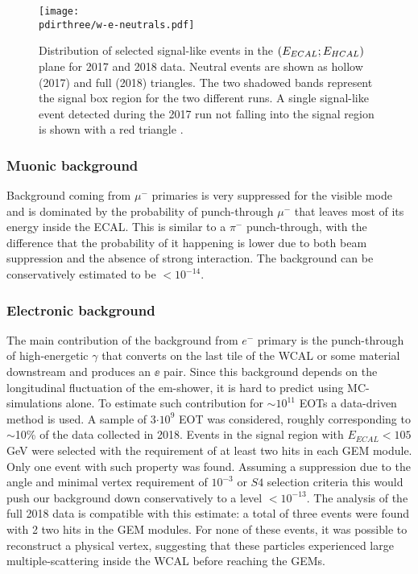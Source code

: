 \begin{figure}[bth!]
  \centering
  \texttt{[image: \\pdirthree/w-e-neutrals.pdf]}
  \caption[neutral events in visible mode]{Distribution of selected signal-like events in the $(E_{ECAL};E_{HCAL})$ plane for 2017 and 2018 data. Neutral events are shown as hollow (2017) and full (2018) triangles. The two shadowed bands represent the signal box region for the two different runs. A single signal-like event detected during the 2017 run not falling into the signal region is shown with a red triangle \cite{Banerjee:2019hmi}.}
  \label{fig:w-e-vis}
\end{figure}

\subsubsection{Muonic background}
\label{ch3:sec:bkg:vis:muon}

Background coming from $\mu^-$ primaries is very suppressed for the visible mode and is dominated by the probability of punch-through $\mu^-$ that leaves most of its energy inside the ECAL. This is similar to a $\pi^-$ punch-through, with the difference that the probability of it happening is lower due to both beam suppression and the absence of strong interaction. The background can be conservatively estimated to be $<10^{-14}$.

\subsubsection{Electronic background}
\label{ch3:sec:bkg:vis:elec}

The main contribution of the background from $e^-$ primary is the punch-through of high-energetic $\gamma$ that converts on the last tile of the WCAL or some material downstream and produces an $\ee$ pair. Since this background depends on the longitudinal fluctuation of the em-shower, it is hard to predict using MC-simulations alone. To estimate such contribution for $\sim10^{11}$ EOTs a data-driven method is used. A sample of 3$\cdot 10^9$ EOT was considered, roughly corresponding to $\sim$10\% of the data collected in 2018. Events in the signal region with $E_{ECAL} < 105$ GeV were selected with the requirement of at least two hits in each GEM module. Only one event with such property was found. Assuming a suppression due to the angle and minimal vertex requirement of $10^{-3}$ or $S4$ selection criteria this would push our background down conservatively to a level $<10^{-13}$. The analysis of the full 2018 data is compatible with this estimate: a total of three events were found with 2 two hits in the GEM modules. For none of these events, it was possible to reconstruct a physical vertex, suggesting that these particles experienced large multiple-scattering inside the WCAL before reaching the GEMs.


